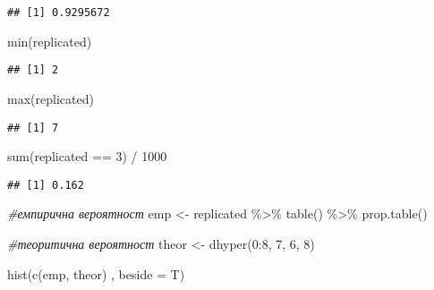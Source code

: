 \documentclass[
]{article}
\newenvironment{Shaded}{\begin{snugshade}}{\end{snugshade}}
\newcommand{\AttributeTok}[1]{\textcolor[rgb]{0.77,0.63,0.00}{#1}}
\newcommand{\CommentTok}[1]{\textcolor[rgb]{0.56,0.35,0.01}{\textit{#1}}}
\newcommand{\DecValTok}[1]{\textcolor[rgb]{0.00,0.00,0.81}{#1}}
\newcommand{\FunctionTok}[1]{\textcolor[rgb]{0.00,0.00,0.00}{#1}}
\newcommand{\NormalTok}[1]{#1}
\newcommand{\OtherTok}[1]{\textcolor[rgb]{0.56,0.35,0.01}{#1}}
\newcommand{\SpecialCharTok}[1]{\textcolor[rgb]{0.00,0.00,0.00}{#1}}
\begin{document}
\begin{verbatim}
## [1] 0.9295672
\end{verbatim}

\begin{Shaded}
\begin{Highlighting}[]
\FunctionTok{min}\NormalTok{(replicated)}
\end{Highlighting}
\end{Shaded}

\begin{verbatim}
## [1] 2
\end{verbatim}

\begin{Shaded}
\begin{Highlighting}[]
\FunctionTok{max}\NormalTok{(replicated)}
\end{Highlighting}
\end{Shaded}

\begin{verbatim}
## [1] 7
\end{verbatim}

\begin{Shaded}
\begin{Highlighting}[]
\FunctionTok{sum}\NormalTok{(replicated }\SpecialCharTok{==} \DecValTok{3}\NormalTok{) }\SpecialCharTok{/} \DecValTok{1000}
\end{Highlighting}
\end{Shaded}

\begin{verbatim}
## [1] 0.162
\end{verbatim}

\begin{Shaded}
\begin{Highlighting}[]
\CommentTok{\#емпирична вероятност}
\NormalTok{emp }\OtherTok{\textless{}{-}}\NormalTok{ replicated }\SpecialCharTok{\%\textgreater{}\%} \FunctionTok{table}\NormalTok{() }\SpecialCharTok{\%\textgreater{}\%} \FunctionTok{prop.table}\NormalTok{()}

\CommentTok{\#теоритична вероятност}
\NormalTok{theor }\OtherTok{\textless{}{-}} \FunctionTok{dhyper}\NormalTok{(}\DecValTok{0}\SpecialCharTok{:}\DecValTok{8}\NormalTok{, }\DecValTok{7}\NormalTok{, }\DecValTok{6}\NormalTok{, }\DecValTok{8}\NormalTok{)}

\FunctionTok{hist}\NormalTok{(}\FunctionTok{c}\NormalTok{(emp, theor) , }\AttributeTok{beside =}\NormalTok{ T)}
\end{Highlighting}
\end{Shaded}
\end{document}
